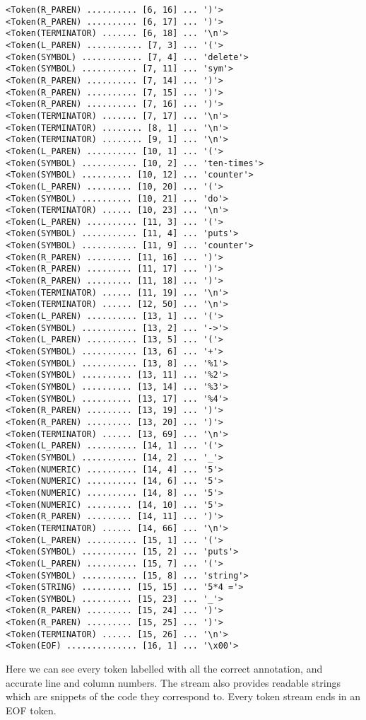\documentclass{article}
\begin{document}
\begin{Verbatim}[baselinestretch=0.75]
<Token(R_PAREN) .......... [6, 16] ... ')'>
<Token(R_PAREN) .......... [6, 17] ... ')'>
<Token(TERMINATOR) ....... [6, 18] ... '\n'>
<Token(L_PAREN) ........... [7, 3] ... '('>
<Token(SYMBOL) ............ [7, 4] ... 'delete'>
<Token(SYMBOL) ........... [7, 11] ... 'sym'>
<Token(R_PAREN) .......... [7, 14] ... ')'>
<Token(R_PAREN) .......... [7, 15] ... ')'>
<Token(R_PAREN) .......... [7, 16] ... ')'>
<Token(TERMINATOR) ....... [7, 17] ... '\n'>
<Token(TERMINATOR) ........ [8, 1] ... '\n'>
<Token(TERMINATOR) ........ [9, 1] ... '\n'>
<Token(L_PAREN) .......... [10, 1] ... '('>
<Token(SYMBOL) ........... [10, 2] ... 'ten-times'>
<Token(SYMBOL) .......... [10, 12] ... 'counter'>
<Token(L_PAREN) ......... [10, 20] ... '('>
<Token(SYMBOL) .......... [10, 21] ... 'do'>
<Token(TERMINATOR) ...... [10, 23] ... '\n'>
<Token(L_PAREN) .......... [11, 3] ... '('>
<Token(SYMBOL) ........... [11, 4] ... 'puts'>
<Token(SYMBOL) ........... [11, 9] ... 'counter'>
<Token(R_PAREN) ......... [11, 16] ... ')'>
<Token(R_PAREN) ......... [11, 17] ... ')'>
<Token(R_PAREN) ......... [11, 18] ... ')'>
<Token(TERMINATOR) ...... [11, 19] ... '\n'>
<Token(TERMINATOR) ...... [12, 50] ... '\n'>
<Token(L_PAREN) .......... [13, 1] ... '('>
<Token(SYMBOL) ........... [13, 2] ... '->'>
<Token(L_PAREN) .......... [13, 5] ... '('>
<Token(SYMBOL) ........... [13, 6] ... '+'>
<Token(SYMBOL) ........... [13, 8] ... '%1'>
<Token(SYMBOL) .......... [13, 11] ... '%2'>
<Token(SYMBOL) .......... [13, 14] ... '%3'>
<Token(SYMBOL) .......... [13, 17] ... '%4'>
<Token(R_PAREN) ......... [13, 19] ... ')'>
<Token(R_PAREN) ......... [13, 20] ... ')'>
<Token(TERMINATOR) ...... [13, 69] ... '\n'>
<Token(L_PAREN) .......... [14, 1] ... '('>
<Token(SYMBOL) ........... [14, 2] ... '_'>
<Token(NUMERIC) .......... [14, 4] ... '5'>
<Token(NUMERIC) .......... [14, 6] ... '5'>
<Token(NUMERIC) .......... [14, 8] ... '5'>
<Token(NUMERIC) ......... [14, 10] ... '5'>
<Token(R_PAREN) ......... [14, 11] ... ')'>
<Token(TERMINATOR) ...... [14, 66] ... '\n'>
<Token(L_PAREN) .......... [15, 1] ... '('>
<Token(SYMBOL) ........... [15, 2] ... 'puts'>
<Token(L_PAREN) .......... [15, 7] ... '('>
<Token(SYMBOL) ........... [15, 8] ... 'string'>
<Token(STRING) .......... [15, 15] ... '5*4 ='>
<Token(SYMBOL) .......... [15, 23] ... '_'>
<Token(R_PAREN) ......... [15, 24] ... ')'>
<Token(R_PAREN) ......... [15, 25] ... ')'>
<Token(TERMINATOR) ...... [15, 26] ... '\n'>
<Token(EOF) .............. [16, 1] ... '\x00'>
      \end{Verbatim}

      Here we can see every token labelled with all the correct annotation,
      and accurate line and column numbers. The stream also  provides readable
      strings which are snippets of the code they correspond to. Every token
      stream ends in an EOF token.
\end{document}
